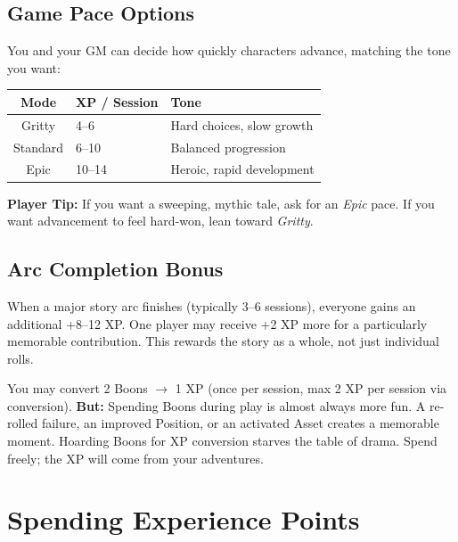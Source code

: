 \subsection{Game Pace Options}
\label{sec:game-pace}
You and your GM can decide how quickly characters advance, matching the tone
you want:

\begin{center}
\begin{tabular}{cll}
\toprule
\textbf{Mode} & \textbf{XP / Session} & \textbf{Tone} \\
\midrule
Gritty   & 4--6  & Hard choices, slow growth \\
Standard & 6--10 & Balanced progression \\
Epic     & 10--14 & Heroic, rapid development \\
\bottomrule
\end{tabular}
\end{center}

\noindent\textbf{Player Tip:} If you want a sweeping, mythic tale, ask for an
\emph{Epic} pace. If you want advancement to feel hard-won, lean toward
\emph{Gritty}.

\subsection{Arc Completion Bonus}
\label{sec:arc-bonus}
When a major story arc finishes (typically 3--6 sessions), everyone gains an
additional +8--12 XP. One player may receive +2 XP more for a particularly
memorable contribution. This rewards the story as a whole, not just individual
rolls.

\begin{tcolorbox}[colback=yellow!5!white, colframe=yellow!75!black, title=Boons vs. XP,breakable]
You may convert 2 Boons $\rightarrow$ 1 XP (once per session, max 2 XP per session via conversion). \textbf{But:} Spending Boons during play is almost always more fun. A re-rolled failure, an improved Position, or an activated Asset creates a memorable moment. Hoarding Boons for XP conversion starves the table of drama. Spend freely; the XP will come from your adventures.
\end{tcolorbox}

\section{Spending Experience Points}
\label{sec:spending-xp}

